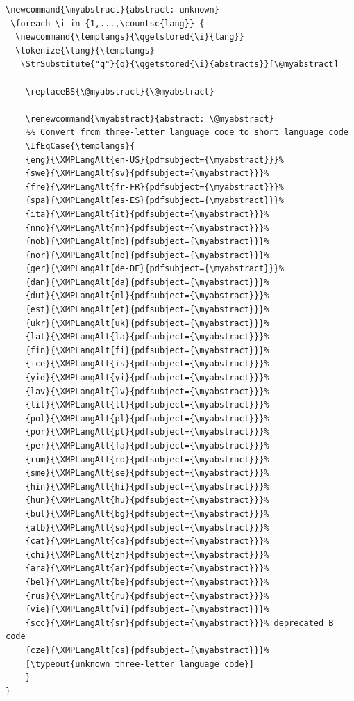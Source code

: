 \begin{lstlisting}[style=myXML,
caption={The \textbackslash divainfo macro has been extended to output the abstracts and keywords. This code has been edited to remove the diagnostic output and to simplify it.}, label={lst:codeForAbstracts}]
%% experiment with dc:description
\newcommand{\myabstract}{abstract: unknown}
 \foreach \i in {1,...,\countsc{lang}} {
  \newcommand{\templangs}{\qgetstored{\i}{lang}}
  \tokenize{\lang}{\templangs}
   \StrSubstitute{"q"}{q}{\qgetstored{\i}{abstracts}}[\@myabstract]

    \replaceBS{\@myabstract}{\@myabstract}

    \renewcommand{\myabstract}{abstract: \@myabstract}
    %% Convert from three-letter language code to short language code
    \IfEqCase{\templangs}{
    {eng}{\XMPLangAlt{en-US}{pdfsubject={\myabstract}}}%
    {swe}{\XMPLangAlt{sv}{pdfsubject={\myabstract}}}%
    {fre}{\XMPLangAlt{fr-FR}{pdfsubject={\myabstract}}}%
    {spa}{\XMPLangAlt{es-ES}{pdfsubject={\myabstract}}}%
    {ita}{\XMPLangAlt{it}{pdfsubject={\myabstract}}}%
    {nno}{\XMPLangAlt{nn}{pdfsubject={\myabstract}}}%
    {nob}{\XMPLangAlt{nb}{pdfsubject={\myabstract}}}%
    {nor}{\XMPLangAlt{no}{pdfsubject={\myabstract}}}%
    {ger}{\XMPLangAlt{de-DE}{pdfsubject={\myabstract}}}%
    {dan}{\XMPLangAlt{da}{pdfsubject={\myabstract}}}%
    {dut}{\XMPLangAlt{nl}{pdfsubject={\myabstract}}}%
    {est}{\XMPLangAlt{et}{pdfsubject={\myabstract}}}%
    {ukr}{\XMPLangAlt{uk}{pdfsubject={\myabstract}}}%
    {lat}{\XMPLangAlt{la}{pdfsubject={\myabstract}}}%
    {fin}{\XMPLangAlt{fi}{pdfsubject={\myabstract}}}%
    {ice}{\XMPLangAlt{is}{pdfsubject={\myabstract}}}%
    {yid}{\XMPLangAlt{yi}{pdfsubject={\myabstract}}}%
    {lav}{\XMPLangAlt{lv}{pdfsubject={\myabstract}}}%
    {lit}{\XMPLangAlt{lt}{pdfsubject={\myabstract}}}%
    {pol}{\XMPLangAlt{pl}{pdfsubject={\myabstract}}}%
    {por}{\XMPLangAlt{pt}{pdfsubject={\myabstract}}}%
    {per}{\XMPLangAlt{fa}{pdfsubject={\myabstract}}}%
    {rum}{\XMPLangAlt{ro}{pdfsubject={\myabstract}}}%
    {sme}{\XMPLangAlt{se}{pdfsubject={\myabstract}}}%
    {hin}{\XMPLangAlt{hi}{pdfsubject={\myabstract}}}%
    {hun}{\XMPLangAlt{hu}{pdfsubject={\myabstract}}}%
    {bul}{\XMPLangAlt{bg}{pdfsubject={\myabstract}}}%
    {alb}{\XMPLangAlt{sq}{pdfsubject={\myabstract}}}%
    {cat}{\XMPLangAlt{ca}{pdfsubject={\myabstract}}}%
    {chi}{\XMPLangAlt{zh}{pdfsubject={\myabstract}}}%
    {ara}{\XMPLangAlt{ar}{pdfsubject={\myabstract}}}%
    {bel}{\XMPLangAlt{be}{pdfsubject={\myabstract}}}%
    {rus}{\XMPLangAlt{ru}{pdfsubject={\myabstract}}}%
    {vie}{\XMPLangAlt{vi}{pdfsubject={\myabstract}}}%
    {scc}{\XMPLangAlt{sr}{pdfsubject={\myabstract}}}% deprecated B code
    {cze}{\XMPLangAlt{cs}{pdfsubject={\myabstract}}}%
    [\typeout{unknown three-letter language code}]
    }
}
\end{lstlisting}
\clearpage
